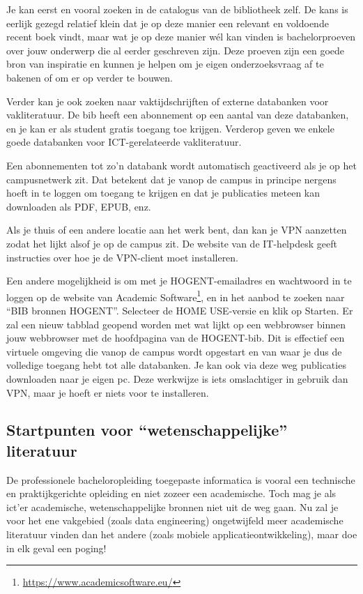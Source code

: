 Je kan eerst en vooral zoeken in de catalogus van de bibliotheek zelf. De kans is eerlijk gezegd relatief klein dat je op deze manier een relevant en voldoende recent boek vindt, maar wat je op deze manier wél kan vinden is bachelorproeven over jouw onderwerp die al eerder geschreven zijn. Deze proeven zijn een goede bron van inspiratie en kunnen je helpen om je eigen onderzoeksvraag af te bakenen of om er op verder te bouwen.

Verder kan je ook zoeken naar vaktijdschrijften of externe databanken voor vakliteratuur. De bib heeft een abonnement op een aantal van deze databanken, en je kan er als student gratis toegang toe krijgen. Verderop geven we enkele goede databanken voor ICT-gerelateerde vakliteratuur.

Een abonnementen tot zo'n databank wordt automatisch geactiveerd als je op het campusnetwerk zit. Dat betekent dat je vanop de campus in principe nergens hoeft in te loggen om toegang te krijgen en dat je publicaties meteen kan downloaden als PDF, EPUB, enz.

Als je thuis of een andere locatie aan het werk bent, dan kan je VPN aanzetten zodat het lijkt alsof je op de campus zit. De website van de IT-helpdesk geeft instructies over hoe je de VPN-client moet installeren.

Een andere mogelijkheid is om met je HOGENT-emailadres en wachtwoord in te loggen op de website van Academic Software\footnote{\url{https://www.academicsoftware.eu/}}, en in het aanbod te zoeken naar ``BIB bronnen HOGENT''. Selecteer de HOME USE-versie en klik op Starten. Er zal een nieuw tabblad geopend worden met wat lijkt op een webbrowser binnen jouw webbrowser met de hoofdpagina van de HOGENT-bib. Dit is effectief een virtuele omgeving die vanop de campus wordt opgestart en van waar je dus de volledige toegang hebt tot alle databanken. Je kan ook via deze weg publicaties downloaden naar je eigen pc. Deze werkwijze is iets omslachtiger in gebruik dan VPN, maar je hoeft er niets voor te installeren.

\subsection{Startpunten voor ``wetenschappelijke'' literatuur}%
\label{ssec:startpunten-wetenschappelijke-literatuur}

De professionele bacheloropleiding toegepaste informatica is vooral een technische en praktijkgerichte opleiding en niet zozeer een academische. Toch mag je als ict'er academische, wetenschappelijke bronnen niet uit de weg gaan. Nu zal je voor het ene vakgebied (zoals data engineering) ongetwijfeld meer academische literatuur vinden dan het andere (zoals mobiele applicatieontwikkeling), maar doe in elk geval een poging!

